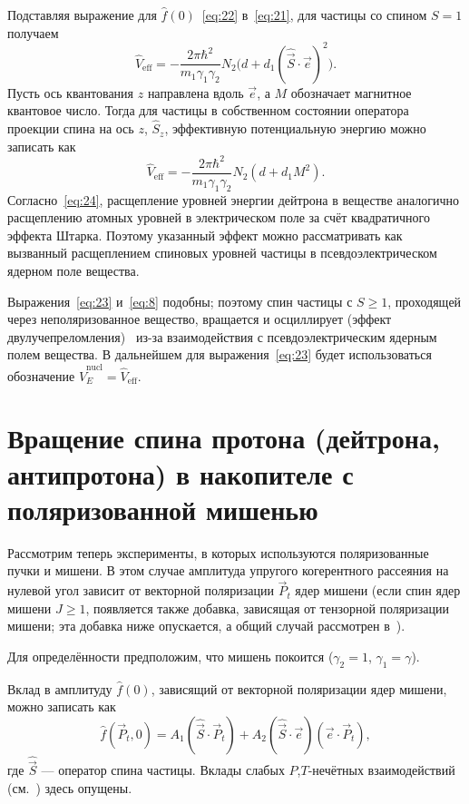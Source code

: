 \documentclass[11pt,a4paper]{article}
\newcommand{\hvec}[1]{\hat{\vec{#1}}}
\begin{document}
Подставляя выражение для $\hat{f}(0)$~\eqref{eq:22} в~\eqref{eq:21},
для частицы со спином $S=1$ получаем
\begin{equation}
\hat{V}_{\mathrm{eff}}
=-\frac{2\pi\hbar^2}{m_1\gamma_1\gamma_2}N_2\bigl(d+d_1(\hvec{S}\cdot\vec{e})^2\bigr).
\label{eq:23}
\end{equation}
Пусть ось квантования $z$ направлена вдоль $\vec{e}$, а $M$ обозначает
магнитное квантовое число. Тогда для частицы в собственном состоянии
оператора проекции спина на ось $z$, $\hat{S}_z$, эффективную
потенциальную энергию можно записать как
\begin{equation}
\hat{V}_{\mathrm{eff}}
=-\frac{2\pi\hbar^2}{m_1\gamma_1\gamma_2}N_2(d+d_1 M^2).
\label{eq:24}
\end{equation}
Согласно~\eqref{eq:24}, расщепление уровней энергии дейтрона в веществе
аналогично расщеплению атомных уровней в электрическом поле за счёт
квадратичного эффекта Штарка. Поэтому указанный эффект можно рассматривать
как вызванный расщеплением спиновых уровней частицы в псевдоэлектрическом
ядерном поле вещества.

Выражения~\eqref{eq:23} и~\eqref{eq:8} подобны; поэтому спин частицы
с $S\geqslant 1$, проходящей через неполяризованное вещество, вращается
и осциллирует (эффект двулучепреломления)~\cite{Bary92,Bary93} из-за
взаимодействия с псевдоэлектрическим ядерным полем вещества.
В дальнейшем для выражения~\eqref{eq:23} будет использоваться обозначение
$\hat{V}_E^{\mathrm{nucl}}=\hat{V}_{\mathrm{eff}}$.

\section{Вращение спина протона (дейтрона, антипротона) в накопителе
с поляризованной мишенью}

Рассмотрим теперь эксперименты, в которых используются поляризованные
пучки и мишени. В этом случае амплитуда упругого когерентного рассеяния
на нулевой угол зависит от векторной поляризации $\vec{P}_t$ ядер мишени
(если спин ядер мишени $J\geqslant 1$, появляется также добавка,
зависящая от тензорной поляризации мишени; эта добавка ниже опускается,
а общий случай рассмотрен в~\cite{Bary83a,Bary93}).

Для определённости предположим, что мишень покоится ($\gamma_2=1$,
$\gamma_1=\gamma$).

Вклад в амплитуду $\hat{f}(0)$, зависящий от векторной поляризации ядер
мишени, можно записать как
\begin{equation}
\hat{f}(\vec{P}_t,0)=A_1(\hvec{S}\cdot\vec{P}_t)+A_2(\hvec{S}\cdot\vec{e})(\vec{e}\cdot\vec{P}_t),
\label{eq:25}
\end{equation}
где $\hvec{S}$ --- оператор спина частицы. Вклады слабых $P$,$T$-нечётных
взаимодействий (см.~\cite{Bary83a,BaryShirvel05,Bary0504064,BaryGurin05})
здесь опущены.
\end{document}
